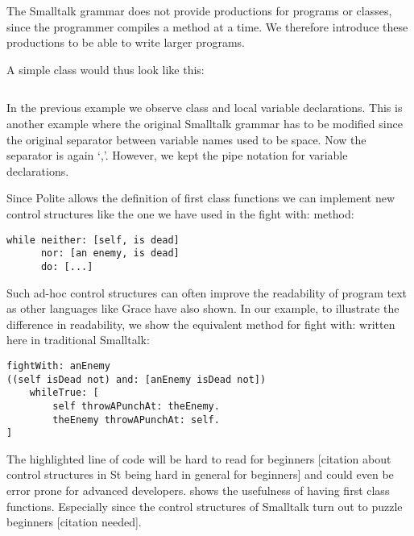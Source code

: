 The Smalltalk grammar does not provide productions for programs or classes, since the programmer compiles a method at a time. We therefore introduce these productions to be able to write larger programs.


A simple class would thus look like this:


\inputminted[bgcolor=lbcolor]{text}{polite-hero.polite}


In the previous example we observe class and local variable declarations. This is another example where the original Smalltalk grammar has to be modified since the original separator between variable names used to be space. Now the separator is again `,’. However, we kept the pipe notation for variable declarations.

Since Polite allows the definition of first class functions we can implement new control structures like the one we have used in the fight with: method: 

\begin{verbatim}
while neither: [self, is dead] 
	  nor: [an enemy, is dead] 
	  do: [...] 
\end{verbatim}

Such ad-hoc control structures can often improve the readability of program text as other languages like Grace have also shown\cite{Grace12}. In our example, to illustrate the difference in readability, we show the equivalent method for fight with: written here in traditional Smalltalk:

\begin{verbatim}
fightWith: anEnemy
((self isDead not) and: [anEnemy isDead not]) 
	whileTrue: [
    	self throwAPunchAt: theEnemy.
    	theEnemy throwAPunchAt: self.
]
\end{verbatim}

The highlighted line of code will be hard to read for beginners [citation about control structures in St being hard in general for beginners] and could even be error prone for advanced developers.  shows the usefulness of having first class functions. Especially since the control structures of Smalltalk turn out to puzzle beginners [citation needed]. 
